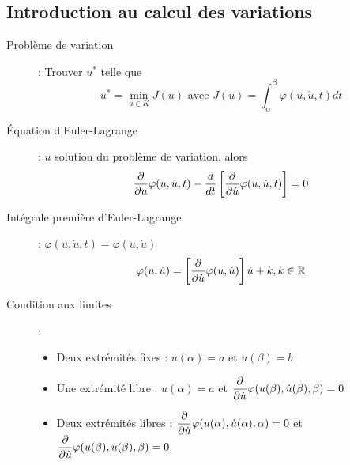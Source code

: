 \subsection{Introduction au calcul des variations}
\begin{description}
\item[Problème de variation] : Trouver $u^*$ telle que
    \[
        u^*=\min_{u\in K}J(u)
        \textrm{ avec }
        J(u)=\int_\alpha^\beta\varphi(u,\dot u, t)dt
    \]
\item[Équation d'Euler-Lagrange] : $u$ solution du problème de variation, alors
    \[
        \dfrac{\partial }{\partial u}\varphi(u,\dot u,t)-
        \frac{d}{dt}\left[\dfrac{\partial }{\partial \dot u}\varphi(u,\dot u, t)\right]=0
    \]
\item[Intégrale première d’Euler-Lagrange] : $\varphi(u,\dot u,t)=\varphi(u, \dot u)$
    \[
        \varphi(u,\dot u)=\left[\dfrac{\partial }{\partial \dot u}\varphi(u,\dot u)\right]\dot u+k, k\in\mathbb{R}
    \]
\item[Condition aux limites] :
    \begin{itemize}
    \item Deux extrémités fixes : $u(\alpha)=a$ et $u(\beta)=b$
    \item Une extrémité libre : $u(\alpha)=a$ et $\dfrac{\partial }{\partial \dot u}\varphi(u(\beta),\dot u(\beta), \beta)=0$
    \item Deux extrémités libres : $\dfrac{\partial }{\partial \dot u}\varphi(u(\alpha),\dot u(\alpha), \alpha)=0$ et $\dfrac{\partial }{\partial \dot u}\varphi(u(\beta),\dot u(\beta), \beta)=0$
    \end{itemize}
\end{description}